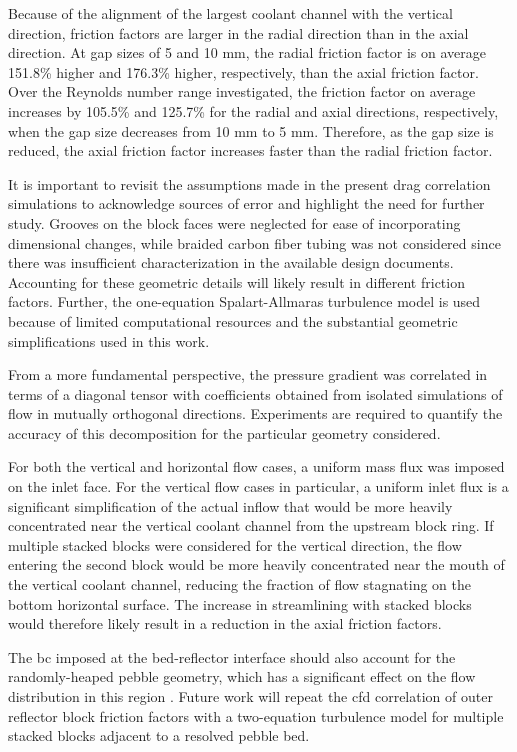 Because of the alignment of the largest coolant channel with the vertical direction, friction factors are larger in the radial direction than in the axial direction. At gap sizes of 5 and 10 \si{\milli\meter}, the radial friction factor is on average 151.8\% higher and 176.3\% higher, respectively, than the axial friction factor. Over the Reynolds number range investigated, the friction factor on average increases by 105.5\% and 125.7\% for the radial and axial directions, respectively, when the gap size decreases from 10 \si{\milli\meter} to 5 \si{\milli\meter}. Therefore, as the gap size is reduced, the axial friction factor increases faster than the radial friction factor.

It is important to revisit the assumptions made in the present drag correlation simulations to acknowledge sources of error and highlight the need for further study. Grooves on the block faces were neglected for ease of incorporating dimensional changes, while braided carbon fiber tubing was not considered since there was insufficient characterization in the available design documents. Accounting for these geometric details will likely result in different friction factors. Further, the one-equation Spalart-Allmaras turbulence model is used because of limited computational resources and the substantial geometric simplifications used in this work. 

From a more fundamental perspective, the pressure gradient was correlated in terms of a diagonal tensor with coefficients obtained from isolated simulations of flow in mutually orthogonal directions. Experiments are required to quantify the accuracy of this decomposition for the particular geometry considered. 

For both the vertical and horizontal flow cases, a uniform mass flux was imposed on the inlet face. For the vertical flow cases in particular, a uniform inlet flux is a significant simplification of the actual inflow that would be more heavily concentrated near the vertical coolant channel from the upstream block ring. If multiple stacked blocks were considered for the vertical direction, the flow entering the second block would  be more heavily concentrated near the mouth of the vertical coolant channel, reducing the fraction of flow stagnating on the bottom horizontal surface. The increase in streamlining with stacked blocks would therefore likely result in a reduction in the axial friction factors.

The \gls{bc} imposed at the bed-reflector interface should also account for the randomly-heaped pebble geometry, which has a significant effect on the flow distribution in this region \cite{amini}. Future work will repeat the \gls{cfd} correlation of outer reflector block friction factors with a two-equation turbulence model for multiple stacked blocks adjacent to a resolved pebble bed.

